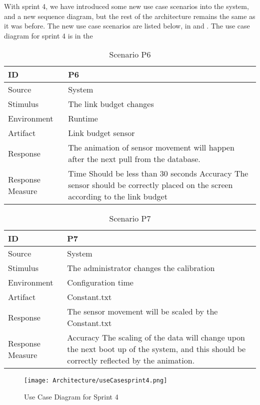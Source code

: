 \documentclass[../document.tex]{subfiles}
\begin{document}
With sprint 4, we have introduced some new use case scenarios into the system, and a new sequence diagram, but the rest of the architecture remains the same as it was before. The new use case scenarios are listed below, in  and . The use case diagram for sprint 4 is in the 
\begin{table}[H]
\caption{Scenario P6}
\label{scenario6}
\begin{tabularx}{\textwidth}{|X|X|}
\hline	
ID
&P6
\\ \hline Source
&System
\\ \hline Stimulus
&The link budget changes
\\ \hline Environment
&Runtime
\\ \hline Artifact
&Link budget sensor
\\ \hline Response
&The animation of sensor movement will happen after the next pull from the database.
\\ \hline Response Measure
&Time \newline
Should be less than 30 seconds \newline
Accuracy \newline
The sensor should be correctly placed on the screen according to the link budget
\\ \hline
\end{tabularx}
\end{table}

\begin{table}[H]
\caption{Scenario P7}
\label{scenario7}
\begin{tabularx}{\textwidth}{|X|X|}
\hline	
ID
&P7
\\ \hline Source
&System
\\ \hline Stimulus
&The administrator changes the calibration
\\ \hline Environment
&Configuration time
\\ \hline Artifact
&Constant.txt
\\ \hline Response
&The sensor movement will be scaled by the Constant.txt
\\ \hline Response Measure
&Accuracy \newline
The scaling of the data will change upon the next boot up of the system, and this should be correctly reflected by the animation.
\\ \hline
\end{tabularx}
\end{table}

\begin{figure}[H]
	\centering
	\texttt{[image: Architecture/useCasesprint4.png]}
	\caption{Use Case Diagram for Sprint 4}
	\label{usecasesprint4}
\end{figure}
\end{document}
